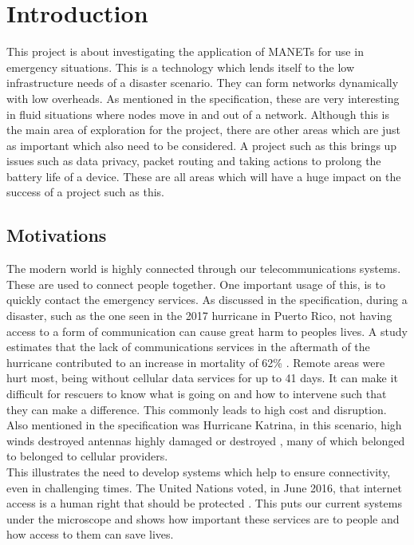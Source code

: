 \documentclass{report}
\begin{document}
\chapter{Introduction}
This project is about investigating the application of MANETs for use in emergency situations. This is a technology which lends itself to the low infrastructure needs of a disaster scenario. They can form networks dynamically with low overheads. As mentioned in the specification, these are very interesting in fluid situations where nodes move in and out of a network\cite{sun2001mobile}. Although this is the main area of exploration for the project, there are other areas which are just as important which also need to be considered. A project such as this brings up issues such as data privacy, packet routing and taking actions to prolong the battery life of a device. These are all areas which will have a huge impact on the success of a project such as this.  

\section{Motivations}
The modern world is highly connected through our telecommunications systems. These are used to connect people together. One important usage of this, is to quickly contact the emergency services. As discussed in the specification, during a disaster, such as the one seen in the 2017 hurricane in Puerto Rico, not having access to a form of communication can cause great harm to peoples lives. A study estimates that the lack of communications services in the aftermath of the hurricane contributed to an increase in mortality of 62\% \cite{kishore2018mortality}. Remote areas were hurt most, being without cellular data services for up to 41 days. It can make it difficult for rescuers to know what is going on and how to intervene such that they can make a difference. This commonly leads to high cost and disruption. Also mentioned in the specification was Hurricane Katrina, in this scenario, high winds destroyed antennas highly damaged or destroyed \cite{banipal2006strategic}, many of which belonged to belonged to cellular providers.
\bigskip\\
This illustrates the need to develop systems which help to ensure connectivity, even in challenging times. The United Nations voted, in June 2016, that internet access is a human right that should be protected \cite{UNResolutionJune2016}. This puts our current systems under the microscope and shows how important these services are to people and how access to them can save lives.  
\end{document}
